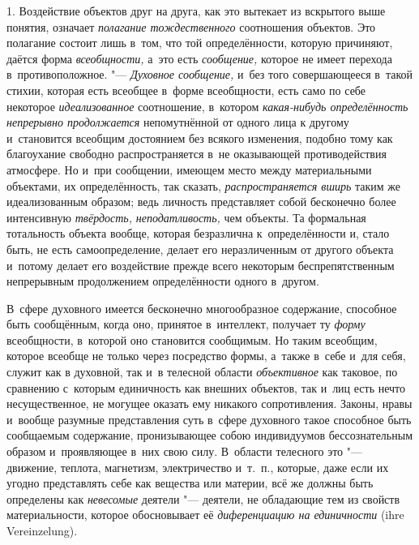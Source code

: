 1. Воздействие объектов друг на друга, как это вытекает из
вскрытого выше понятия, означает
{\em полагание тождественного}
соотношения объектов. Это полагание состоит лишь в~том, что
той определённости, которую
причиняют,
даётся форма
{\em всеобщности,} а~это
есть {\em сообщение,}
которое не имеет перехода в~противоположное. "---
{\em Духовное сообщение,}
и~без того совершающееся в~такой стихии, которая есть
всеобщее в~форме всеобщности, есть само по себе некоторое
{\em идеализованное}
соотношение, в~котором
{\em какая-нибудь определённость
непрерывно продолжается} непомутнённой от одного лица к
другому и~становится всеобщим достоянием без всякого изменения, подобно
тому как благоухание свободно распространяется в~не оказывающей
противодействия атмосфере. Но и~при сообщении, имеющем место между
материальными объектами, их определённость, так сказать,
{\em распространяется вширь}
таким же идеализованным образом; ведь личность представляет
собой бесконечно более интенсивную
{\em твёрдость,}{\em
неподатливость,} чем объекты. Та формальная
тотальность объекта вообще, которая безразлична к~определённости и, стало
быть, не есть самоопределение, делает его неразличенным от другого объекта
и~потому делает его воздействие прежде всего некоторым беспрепятственным
непрерывным продолжением определённости одного в~другом.

В~сфере духовного имеется бесконечно многообразное содержание,
способное быть сообщённым, когда оно, принятое в~интеллект, получает ту
{\em форму} всеобщности,
в~которой оно становится сообщимым. Но таким всеобщим, которое всеобще не
только через посредство формы, а~также в~себе и~для себя, служит как в
духовной, так и~в телесной области
{\em объективное} как
таковое, по сравнению с~которым единичность как внешних объектов, так и~лиц
есть нечто несущественное, не могущее оказать ему никакого сопротивления.
Законы, нравы и~вообще разумные представления суть в~сфере духовного такое
способное быть сообщаемым содержание, пронизывающее собою индивидуумов
бессознательным образом и~проявляющее в~них свою силу. В~области телесного
это "--- движение, теплота, магнетизм, электричество и~т.~п.,
которые, даже если их угодно представлять себе как вещества или материи,
всё же должны быть определены как
{\em невесомые} деятели
"--- деятели, не обладающие тем из свойств материальности,
которое обосновывает её
{\em диференциацию на единичности} (ihre Verein\-zelung).

